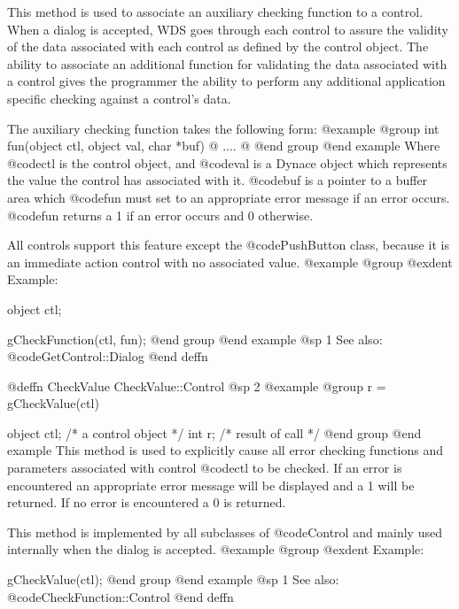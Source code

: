 This method is used to associate an auxiliary checking function to a control.
When a dialog is accepted, WDS goes through each control to assure the
validity of the data associated with each control as defined by the control
object.  The ability to associate an additional function for validating
the data associated with a control gives the programmer the ability to perform
any additional application specific checking against a control's data.

The auxiliary checking function takes the following form:
@example
@group
int     fun(object ctl, object val, char *buf)
@{
        ....
@}
@end group
@end example
Where @code{ctl} is the control object, and @code{val} is a Dynace object which
represents the value the control has associated with it.  @code{buf} is a
pointer to a buffer area which @code{fun} must set to an appropriate error
message if an error occurs.  @code{fun} returns a 1 if an error occurs and
0 otherwise.

All controls support this feature except the @code{PushButton} class,
because it is an immediate action control with no associated value.
@example
@group
@exdent Example:

object  ctl;

gCheckFunction(ctl, fun);
@end group
@end example
@sp 1
See also:  @code{GetControl::Dialog}
@end deffn















@deffn {CheckValue} CheckValue::Control
@sp 2
@example
@group
r = gCheckValue(ctl)

object   ctl;   /*  a control object  */
int      r;     /*  result of call    */
@end group
@end example
This method is used to explicitly cause all error checking functions and
parameters associated with control @code{ctl} to be checked.  If an error
is encountered an appropriate error message will be displayed and a 1
will be returned.  If no error is encountered a 0 is returned.

This method is implemented by all subclasses of @code{Control} and mainly
used internally when the dialog is accepted.
@example
@group
@exdent Example:

gCheckValue(ctl);
@end group
@end example
@sp 1
See also:  @code{CheckFunction::Control}
@end deffn


















